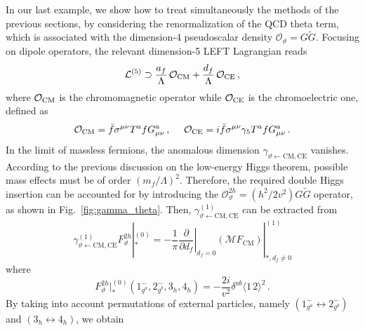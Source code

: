 \documentclass[prl,twocolumn,twoside,preprintnumbers,superscriptaddress, nofootinbib]{revtex4-2}
\newcommand{\agl}[2]{\langle#1\, #2 \rangle}
\begin{document}
In our last example, we show how to treat simultaneously 
the methods of the previous sections, by considering the renormalization 
of the QCD theta term, which is associated with the dimension-4 pseudoscalar density $\mathcal O_\vartheta=G\tilde G$. 
Focusing on dipole operators, the relevant dimension-5 LEFT
Lagrangian reads
%
\begin{equation}
\begin{split}
\mathcal L^{(5)} \supset \frac{a_f}{\Lambda} \,\mathcal O_{\rm CM}+ 
\frac{d_f}{\Lambda} \,\mathcal O_{\rm CE}\,,
\end{split}
\end{equation}
%
where $\mathcal O_{\rm CM}$ is the chromomagnetic operator while
$\mathcal O_{\rm CE}$ is the chromoelectric one, defined as
%
\begin{equation}
    \mathcal O_{\rm CM} = \bar f \sigma^{\mu\nu} T^a f G^a_{\mu\nu}\,,
~~~~
    \mathcal O_{\rm CE} = i\bar f \sigma^{\mu\nu}\gamma_5 T^a f G^a_{\mu\nu} \,.
\end{equation}
%
In the limit of massless fermions, the anomalous dimension
$\gamma_{\vartheta\leftarrow \text{CM},\text{CE}}$ vanishes. 
According to the previous discussion on the low-energy 
Higgs theorem, possible mass effects must be of order 
$(m_f/\Lambda)^2$.
Therefore, the required double Higgs insertion can be accounted 
for by introducing the $\mathcal{O}^{2h}_{\vartheta}=(h^2/2v^2) G\tilde G$ operator, as shown in Fig.~\ref{fig:gamma_theta}. 
Then, $\gamma^{(1)}_{\vartheta\leftarrow \text{CM},\text{CE}}$ can be extracted from
%
\begin{equation}\label{eq:gamma_thetaCMCE}
\!\! \gamma^{(1)}_{\vartheta\leftarrow \text{CM},\text{CE}} F^{2h}_{\vartheta}|_{*}^{(0)} = -\frac{1}{\pi}\left.\frac{\partial}{\partial d_f}\right|_{d_f=0}\!(\mathcal M F_{\text{CM}})|_{*,d_f\neq 0}^{(1)}
\end{equation}
%
where
%
\begin{equation}
F_{\vartheta}^{2h}|_{*}^{(0)}(1^-_{g^a},2^-_{g^b},3_h,4_h)=-\frac{2i}{v^2}\delta^{ab}\agl{1}{2}^2\,.
\end{equation}
%
By taking into account permutations of external particles, namely $(1^-_{g^a} \leftrightarrow 2^-_{g^b})$ and $(3_h \leftrightarrow 4_h)$, we obtain
\end{document}
